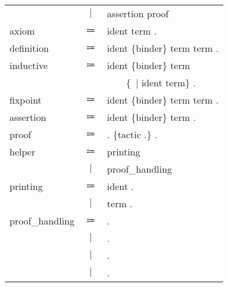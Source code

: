 \begin{table}[!htb]
\begin{tabular}{lcl}
            &$\mid$&assertion proof\\
        axiom
            &$\Coloneqq$&\fAxiom{} ident \scolon{} term .\\
        definition
            &$\Coloneqq$&\fDefinition{} ident \{binder\} \scolon{} term \scoloneq{} term .\\
        inductive
            &$\Coloneqq$&\fInductive{} ident \{binder\} \scolon{} term \scoloneq{}\\
            &&~~~~\{~$\mid$ ident \scolon{} term\} .\\
        fixpoint
            &$\Coloneqq$&\fFixpoint{} ident \{binder\} \scolon{} term \scoloneq{} term .\\
        assertion
            &$\Coloneqq$&\fTheorem{} ident \{binder\} \scolon{} term .\\
        proof
            &$\Coloneqq$&\fProof{} . \{tactic .\} \fQed{} .\\
        helper
            &$\Coloneqq$&printing\\
            &$\mid$&proof\_handling\\
        printing
            &$\Coloneqq$&\fPrint{} ident .\\
            &$\mid$&\fCheck{} term .\\
        proof\_handling
            &$\Coloneqq$&\fUndo{} .\\
            &$\mid$&\fRestart{} .\\
            &$\mid$&\fAdmitted{} .\\
            &$\mid$&\fAbort{} .\\
    \end{tabular}
\end{table}
\newpage

